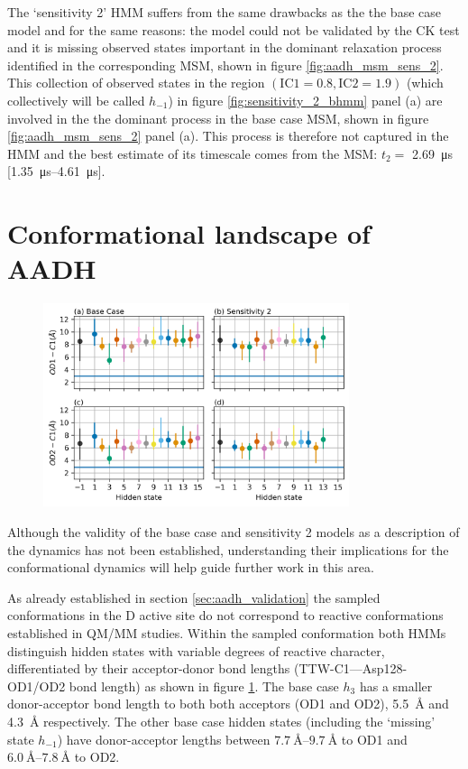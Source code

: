 The `sensitivity 2' HMM suffers from the same drawbacks as the the base case model and for the same reasons: the model could not be validated by the CK test and it is missing observed states important in the dominant relaxation process identified in the corresponding MSM, shown in figure \ref{fig:aadh_msm_sens_2}. This collection of observed states in the region $(\mathrm{IC 1}=0.8, \mathrm{IC 2}=1.9)$ (which collectively will be called $h_{-1}$) in figure \ref{fig:sensitivity_2_bhmm} panel (a) are involved in the the dominant process in the  base case MSM, shown in figure \ref{fig:aadh_msm_sens_2} panel (a). This process is therefore not captured in the HMM and the best estimate of its timescale comes from the MSM: $t_2 =$ \SI{2.69}{\micro\second} [\SIrange[range-phrase=-]{1.35}{4.61}{\micro\second}].

\section{Conformational landscape of AADH}\label{sec:aadh_landscape}

\begin{figure}
    \centering
    \includegraphics[width=0.8\textwidth]{chapters/aadh/figures/bond_dist_h_states.png}
    \label{fig:addh_bond_dist_h_state}
\end{figure}

Although the validity of the base case and sensitivity 2 models as a description of the dynamics has not been established, understanding their implications for the conformational dynamics will help guide further work in this area. 

As already established in section \ref{sec:aadh_validation} the sampled conformations in the D active site do not correspond to reactive conformations established in QM/MM studies.  Within the sampled conformation both HMMs distinguish hidden states with variable degrees of reactive character,  differentiated by their acceptor-donor bond lengths (TTW-C1---Asp128-OD1/OD2 bond length) as shown in figure \ref{fig:addh_bond_dist_h_state}. The base case $h_{3}$ has a smaller donor-acceptor bond length to both both acceptors (OD1 and OD2), \SI{5.5}{\angstrom} and \SI{4.3}{\angstrom} respectively. The other base case hidden states (including the `missing' state $h_{-1}$) have donor-acceptor lengths between $\SIrange{7.7}{9.7}{\angstrom}$ to OD1 and $\SIrange{6.0}{7.8}{\angstrom}$ to OD2. 


